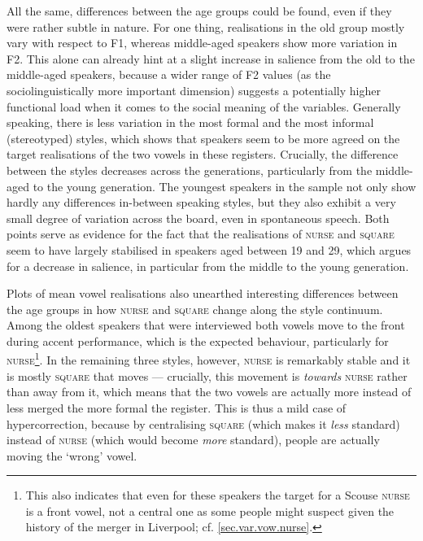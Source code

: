 All the same, differences between the age groups could be found, even if they were rather subtle in nature.
For one thing, realisations in the old group mostly vary with respect to F1, whereas middle-aged speakers show more variation in F2.
This alone can already hint at a slight increase in salience from the old to the middle-aged speakers, because a wider range of F2 values (as the sociolinguistically more important dimension) suggests a potentially higher functional load when it comes to the social meaning of the variables.
Generally speaking, there is less variation in the most formal and the most informal (stereotyped) styles, which shows that speakers seem to be more agreed on the target realisations of the two vowels in these registers.
Crucially, the difference between the styles decreases across the generations, particularly from the middle-aged to the young generation.
The youngest speakers in the sample not only show hardly any differences in-between speaking styles, but they also exhibit a very small degree of variation across the board, even in spontaneous speech.
Both points serve as evidence for the fact that the realisations of \textsc{nurse} and \textsc{square} seem to have largely stabilised in speakers aged between 19 and 29, which argues for a decrease in salience, in particular from the middle to the young generation.

Plots of mean vowel realisations also unearthed interesting differences between the age groups in how \textsc{nurse} and \textsc{square} change along the style continuum.
Among the oldest speakers that were interviewed both vowels move to the front during accent performance, which is the expected behaviour, particularly for \textsc{nurse}\footnote{This also indicates that even for these speakers the target for a Scouse \textsc{nurse} is a front vowel, not a central one as some people might suspect given the history of the merger in Liverpool; cf. \ref{sec.var.vow.nurse}.}.
In the remaining three styles, however, \textsc{nurse} is remarkably stable and it is mostly \textsc{square} that moves --- crucially, this movement is \emph{towards} \textsc{nurse} rather than away from it, which means that the two vowels are actually more instead of less merged the more formal the register.
This is thus a mild case of hypercorrection, because by centralising \textsc{square} (which makes it \emph{less} standard) instead of \textsc{nurse} (which would become \emph{more} standard), people are actually moving the `wrong' vowel.

